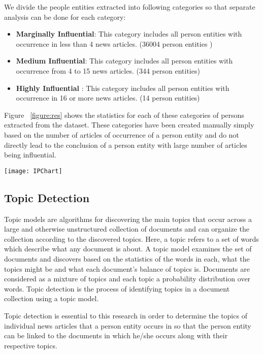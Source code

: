 We divide the people entities extracted into following categories so that separate analysis can be done for each category:
\begin{itemize}
 \item \textbf{Marginally Influential}: This category includes all person entities with occurrence in less than 4 news articles. (36004 person entities )
\item \textbf{Medium Influential}: This category includes all person entities with occurrence from 4 to 15 news articles. (344 person entities) 
\item \textbf{Highly Influential} : This category includes all person entities with occurrence in 16 or more news articles. (14 person entities)
\end{itemize}
Figure ~\ref{figure:res} shows the statistics for each of these categories of persons extracted from the dataset. These categories have been created manually simply based on the number of articles of occurrence of a person entity and do not directly lead to the conclusion of a person entity with large number of articles being influential.

\begin{figure*}
  \centering
\texttt{[image: IPChart]}
\caption{Statistics showing number of persons extracted for each influential person category after PNER from the dataset}
\label{figure:res}
\end{figure*} 


\subsection{Topic Detection}
\label{topic detection}

 Topic models are algorithms for discovering the main topics that occur across a large and otherwise 
unstructured collection of documents and can organize the collection according to the discovered topics.
Here, a topic refers to a set of words which describe what any document is about.
 A topic model examines the set of documents and discovers based on the statistics of the words in each, what the topics might be and what each document's balance of topics is.
Documents are considered as a mixture of topics and each topic a probability distribution over words.
 Topic detection is the process of identifying topics in a document collection using a topic model. 

Topic detection is essential to this research in order to determine the topics of individual news articles that a person entity occurs in so that the person entity can be linked to the documents in which he/she occurs along with their respective topics.

